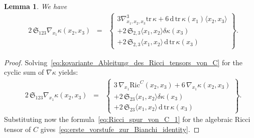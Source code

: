 \documentclass[11pt,a4paper]{article}
\theoremstyle{plain}
\newtheorem{lemma}{Lemma}
\theoremstyle{remark}
\newcommand{\cyclic}{\mathfrak{S}}
\newcommand{\Ric}{\mathrm{Ric}}
\renewcommand{\d}{\mathrm{d}}
\newcommand{\trace}{\mathrm{tr}}
\begin{document}
\bigskip
\begin{lemma}
We have
\begin{align}\label{eq:erste_vorstufe_zur_Bianchi_identity}
& 2\,\cyclic_{123} \nabla_{x_1} \kappa (x_2,x_3)\;\;=\;\;\left \lbrace \begin{array}{c} 3\nabla^3_{x_1,x_2,x_3}\trace \, \kappa +  6\, \d \, \trace \, \kappa(x_1) \langle x_2,x_3\rangle\\ 
+ 2\,\cyclic_{2,3}\langle x_1,x_2\rangle \delta\kappa(x_3)\\
 + 2\,\cyclic_{2,3}\langle x_1,x_2 \rangle\, \d \, \trace \, \kappa(x_3) \end{array} \right \rbrace.
\end{align} 
\end{lemma}
\begin{proof}
Solving~\eqref{eq:kovariante_Ableitung_des_Ricci_tensors_von_C} for the cyclic sum of $\nabla \kappa$ yields:
\begin{align*}
& 2\,\cyclic_{123} \nabla_{x_1} \kappa (x_2,x_3)\;\;=\;\;\left \lbrace \begin{array}{c} 3\, \nabla_{x_1} \Ric^C(x_2,x_3) +  6\, \nabla_{x_1} \kappa(x_2,x_3)\\ 
+ 2\,\cyclic_{23}\langle x_1,x_2\rangle \delta  \kappa(x_3)\\
 + 2\,\cyclic_{23}\langle x_1,x_2 \rangle\, \d \, \trace \, \kappa(x_3) \end{array} \right \rbrace.
\end{align*}
Substituting now the formula~\eqref{eq:Ricci_spur_von_C_1} for the algebraic Ricci tensor of $C$ 
gives~\eqref{eq:erste_vorstufe_zur_Bianchi_identity}.
\end{proof}
\end{document}
